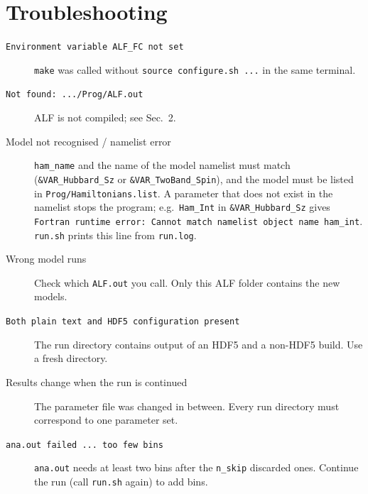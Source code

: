 \documentclass[11pt,a4paper]{article}
\newcommand{\f}[1]{\texttt{#1}}          %
\begin{document}
\section{Troubleshooting}

\begin{description}
\item[\f{Environment variable ALF\_FC not set}] \f{make} was called without
  \f{source configure.sh ...} in the same terminal.
\item[\f{Not found: .../Prog/ALF.out}] ALF is not compiled; see Sec.~2.
\item[Model not recognised / namelist error] \f{ham\_name} and the name of the model namelist
  must match (\f{\&VAR\_Hubbard\_Sz} or \f{\&VAR\_TwoBand\_Spin}), and the model must be listed
  in \f{Prog/Hamiltonians.list}. A parameter that does not exist in the namelist stops the
  program; e.g.\ \f{Ham\_Int} in \f{\&VAR\_Hubbard\_Sz} gives
  \f{Fortran runtime error: Cannot match namelist object name ham\_int}. \f{run.sh} prints this
  line from \f{run.log}.
\item[Wrong model runs] Check which \f{ALF.out} you call. Only this ALF folder contains the
  new models.
\item[\f{Both plain text and HDF5 configuration present}] The run directory contains output
  of an HDF5 and a non-HDF5 build. Use a fresh directory.
\item[Results change when the run is continued] The parameter file was changed in between.
  Every run directory must correspond to one parameter set.
\item[\f{ana.out failed ... too few bins}] \f{ana.out} needs at least two bins after the
  \f{n\_skip} discarded ones. Continue the run (call \f{run.sh} again) to add bins.
\end{description}
\end{document}
